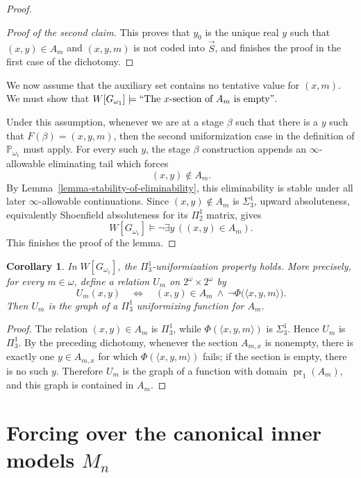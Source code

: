 \documentclass[a4paper,11pt]{article}
\newtheorem{corollary}[theorem]{Corollary}
\newcommand{\forceP}{\mathbb{P}}
\begin{document}
\begin{proof}
\begin{proof}[Proof of the second claim]
This proves that $y_0$ is the unique real $y$ such that $(x,y)\in A_m$ and
$(x,y,m)$ is not coded into $\vec S$, and finishes the proof in the first case
of the dichotomy.
\end{proof}


\medskip
We now assume that the auxiliary set contains no tentative value for $(x,m)$.  We must show that
$W[G_{\omega_1}] \models `` \text{The $x$-section of $A_m$ is empty}".$

Under this assumption, whenever we are at a stage $\beta$ such that there is a $y$ such that $F(\beta)=(x,y,m)$, then the second uniformization case in the definition of $\forceP_{\omega_1}$ must apply.  For every such $y$, the stage $\beta$ construction appends an $\infty$-allowable eliminating tail which forces
\[
   (x,y)\notin A_m.
\]
By Lemma~\ref{lemma-stability-of-eliminability}, this eliminability is stable under all later $\infty$-allowable continuations.  Since $(x,y)\notin A_m$ is $\Sigma^1_3$, upward absoluteness, equivalently Shoenfield absoluteness for its $\Pi^1_2$ matrix, gives
\[
   W[G_{\omega_1}]
   \models \lnot\exists y\,((x,y)\in A_m).
\]
This finishes the proof of the lemma.


\end{proof}
\begin{corollary}
In $W[G_{\omega_1}]$, the $\Pi^1_3$-uniformization property holds.  More
precisely, for every $m\in\omega$, define a relation $U_m$ on
$2^\omega\times2^\omega$ by
\[
   U_m(x,y)
   \quad\Longleftrightarrow\quad
   (x,y)\in A_m
   \ \wedge\
   \neg\Phi\bigl(\langle x,y,m\rangle\bigr).
\]
Then $U_m$ is the graph of a $\Pi^1_3$ uniformizing function for $A_m$.
\end{corollary}

\begin{proof}
The relation $(x,y)\in A_m$ is $\Pi^1_3$, while
$\Phi(\langle x,y,m\rangle)$ is $\Sigma^1_3$.  Hence $U_m$ is
$\Pi^1_3$.  By the preceding dichotomy, whenever the section $A_{m,x}$ is
nonempty, there is exactly one $y\in A_{m,x}$ for which
$\Phi(\langle x,y,m\rangle)$ fails; if the section is empty, there is no such
$y$.  Therefore $U_m$ is the graph of a function with domain
$\operatorname{pr}_1(A_m)$, and this graph is contained in $A_m$.
\end{proof}



\section[Forcing over the canonical inner models Mn]{Forcing over the canonical inner models $M_n$}
\label{section-forcing-over-Mn}
\end{document}
